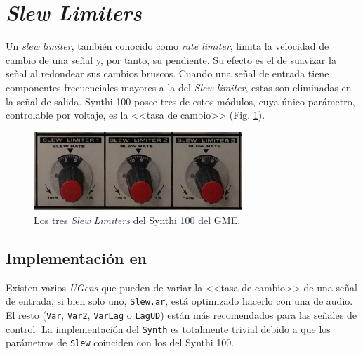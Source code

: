 \section[Slew Limiters]{\textit{Slew Limiters}}
\label{sec:slew_limiters}

Un \textit{slew limiter}, también conocido como \textit{rate limiter}, limita la velocidad de cambio de una señal y, por tanto, su pendiente. Su efecto es el de suavizar la señal al redondear sus cambios bruscos. Cuando una señal de entrada tiene componentes frecuenciales mayores a la del \textit{Slew limiter}, estas son eliminadas en la señal de salida. Synthi 100 posee tres de estos módulos, cuya único parámetro, controlable por voltaje, es la <<tasa de cambio>> (Fig. \ref{fig:slew_limiters}). 

\begin{figure}
	\centering
	\includegraphics[width=0.7\textwidth]{images/slew_limiters}
	\caption[\textit{Slew Limiters}]{Los tres \textit{Slew Limiters} del Synthi 100 del GME.}
	\label{fig:slew_limiters}
\end{figure}

\subsection{Implementación en \appName}
Existen varios \textit{UGens} que pueden de variar la <<tasa de cambio>> de una señal de entrada, si bien solo uno, \texttt{Slew.ar}, está optimizado hacerlo con una de audio. El resto (\texttt{Var}, \texttt{Var2}, \texttt{VarLag} o \texttt{LagUD}) están más recomendados para las señales de control. La implementación del \texttt{Synth} es totalmente trivial debido a que los parámetros de \texttt{Slew} coinciden con los del Synthi 100. 